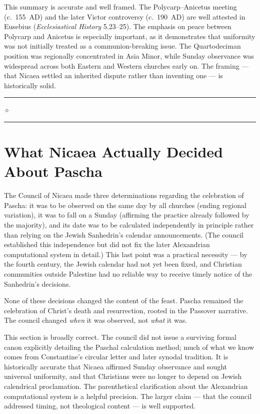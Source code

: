 \documentclass[10pt,twoside,openany]{book}
\newcommand{\ornrule}{%
  \par\bigskip
  {\noindent\hfil{\color{gold}\rule[0.5ex]{1.5in}{0.5pt}%
  \quad$\diamond$\quad%
  \rule[0.5ex]{1.5in}{0.5pt}}\hfil\par}%
  \bigskip
}
\begin{document}
\begin{gptbox}
This summary is accurate and well framed. The Polycarp--Anicetus
meeting (c.\ 155~AD) and the later Victor controversy (c.\ 190~AD)
are well attested in Eusebius (\emph{Ecclesiastical History}
5.23--25). The emphasis on peace between Polycarp and Anicetus is
especially important, as it demonstrates that uniformity was not
initially treated as a communion-breaking issue. The Quartodeciman
position was regionally concentrated in Asia Minor, while Sunday
observance was widespread across both Eastern and Western churches
early on. The framing --- that Nicaea settled an inherited dispute
rather than inventing one --- is historically solid.
\end{gptbox}

\ornrule



\section{What Nicaea Actually Decided About Pascha}

The Council of Nicaea made three determinations regarding the
celebration of Pascha: it was to be observed on the same day by all
churches (ending regional variation), it was to fall on a Sunday
(affirming the practice already followed by the majority), and its
date was to be calculated independently in principle rather than
relying on the Jewish Sanhedrin's calendar announcements. (The council
established this independence but did not fix the later Alexandrian
computational system in detail.) This last point was a practical
necessity --- by the fourth century, the Jewish calendar had not yet
been fixed, and Christian communities outside Palestine had no reliable
way to receive timely notice of the Sanhedrin's decisions.

None of these decisions changed the content of the feast. Pascha
remained the celebration of Christ's death and resurrection, rooted in
the Passover narrative. The council changed \emph{when} it was observed, not
\emph{what} it was.

\begin{gptbox}
This section is broadly correct. The council did not issue a surviving
formal canon explicitly detailing the Paschal calculation method; much
of what we know comes from Constantine's circular letter and later
synodal tradition. It is historically accurate that Nicaea affirmed
Sunday observance and sought universal uniformity, and that Christians
were no longer to depend on Jewish calendrical proclamation. The
parenthetical clarification about the Alexandrian computational system
is a helpful precision. The larger claim --- that the council addressed
timing, not theological content --- is well supported.
\end{gptbox}
\end{document}
